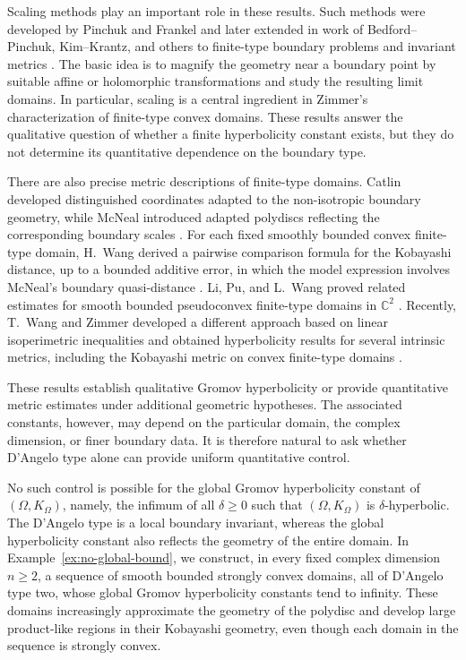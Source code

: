 \documentclass[11pt]{article}
\theoremstyle{definition}
\newcommand{\C}{\mathbb{C}}
\begin{document}
Scaling methods play an important role in these results.  Such methods
were developed by Pinchuk and Frankel and later extended in work of
Bedford--Pinchuk, Kim--Krantz, and others to finite-type boundary
problems and invariant metrics
\cite{PinchukScaling,FrankelAffine,BedfordPinchukScaling,KimKrantzScaling}.
The basic idea is to magnify the geometry near a boundary point by
suitable affine or holomorphic transformations and study the resulting
limit domains.  In particular, scaling is a central ingredient in
Zimmer's characterization of finite-type convex domains.  These results
answer the qualitative question of whether a finite hyperbolicity
constant exists, but they do not determine its quantitative dependence
on the boundary type.

There are also precise metric descriptions of finite-type domains.
Catlin developed distinguished coordinates adapted to the non-isotropic
boundary geometry, while McNeal introduced adapted polydiscs reflecting
the corresponding boundary scales
\cite{CatlinMetrics,McNealConvexFiniteType,McNealBergman}.
 For each fixed smoothly bounded convex finite-type domain, H.~Wang derived a pairwise comparison formula for the Kobayashi distance, up to a bounded additive error, in which the model expression involves McNeal's boundary quasi-distance \cite{WangJLMS}.
Li, Pu, and L.~Wang proved related estimates for smooth bounded
pseudoconvex finite-type domains in \(\C^2\) \cite{LiPuWang}.
Recently, T.~Wang and Zimmer developed a different approach based on linear
isoperimetric inequalities and obtained hyperbolicity results for several
intrinsic metrics, including the Kobayashi metric on convex finite-type
domains \cite{WangZimmerIso}.

These results establish qualitative Gromov hyperbolicity or provide
quantitative metric estimates under additional geometric hypotheses.
The associated constants, however, may depend on the particular domain,
the complex dimension, or finer boundary data. It is therefore natural
to ask whether D'Angelo type alone can provide uniform quantitative
control.

No such control is possible for the global Gromov hyperbolicity constant
of \((\Omega,K_\Omega)\), namely, the infimum of all
\(\delta\geq 0\) such that \((\Omega,K_\Omega)\) is
\(\delta\)-hyperbolic. The
D'Angelo type is a local boundary invariant, whereas the global
hyperbolicity constant also reflects the geometry of the entire domain.
In Example~\ref{ex:no-global-bound}, we construct, in every fixed complex
dimension \(n\ge2\), a sequence of smooth bounded strongly convex domains, all of
D'Angelo type two, whose global Gromov hyperbolicity constants tend to
infinity. These domains increasingly approximate the geometry of the
polydisc and develop large product-like regions in their Kobayashi
geometry, even though each domain in the sequence is strongly convex.
\end{document}
